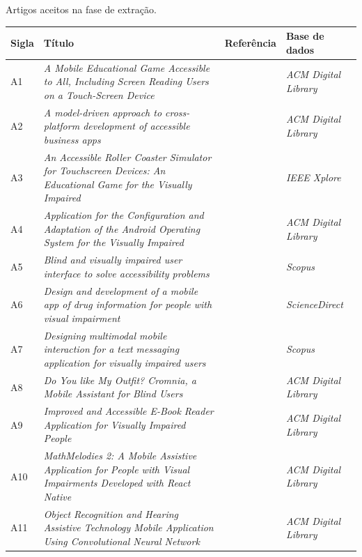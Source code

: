 \begin{quadro}[htb!]
\caption{\label{qua-art-ext}Artigos aceitos na fase de extração.}
\begin{tabular}{|m{0.8cm} | m{8.2cm} | m{2.7cm} | m{2.5cm}|}
    \hline
    \textbf{Sigla} &\textbf{Título} & \textbf{Referência} & \textbf{Base de dados} \\ \hline
    A1 & \emph{A Mobile Educational Game Accessible to All, Including Screen Reading Users on a Touch-Screen Device} & \cite{Leporini2017} & \emph{ACM Digital Library} \\ \hline
    A2 & \emph{A model-driven approach to cross-platform development of accessible business apps} & \cite{Christoph2020} & \emph{ACM Digital Library} \\ \hline
    A3 & \emph{An Accessible Roller Coaster Simulator for Touchscreen Devices: An Educational Game for the Visually Impaired} & \cite{Biase2018} & \emph{IEEE Xplore} \\ \hline
    A4 & \emph{Application for the Configuration and Adaptation of the Android Operating System for the Visually Impaired} & \cite{Oliveira2018} & \emph{ACM Digital Library} \\ \hline
    A5 & \emph{Blind and visually impaired user interface to solve accessibility problems} & \cite{Shera2021285} & \emph{Scopus} \\ \hline
    A6 & \emph{Design and development of a mobile app of drug information for people with visual impairment} & \cite{Amariles2020} & \emph{ScienceDirect} \\ \hline
    A7 & \emph{Designing multimodal mobile interaction for a text messaging application for visually impaired users} & \cite{Duarte2017} & \emph{Scopus} \\ \hline
    A8 & \emph{Do You like My Outfit? Cromnia, a Mobile Assistant for Blind Users} & \cite{Giuliana2018} & \emph{ACM Digital Library} \\ \hline
    A9 & \emph{Improved and Accessible E-Book Reader Application for Visually Impaired People} & \cite{Heesook2017} & \emph{ACM Digital Library} \\ \hline
    A10 & \emph{MathMelodies 2: A Mobile Assistive Application for People with Visual Impairments Developed with React Native} & \cite{Ducci2018} & \emph{ACM Digital Library} \\ \hline
    A11 & \emph{Object Recognition and Hearing Assistive Technology Mobile Application Using Convolutional Neural Network} & \cite{Caballero2020} & \emph{ACM Digital Library} \\ \hline

\end{tabular}
\end{quadro}
